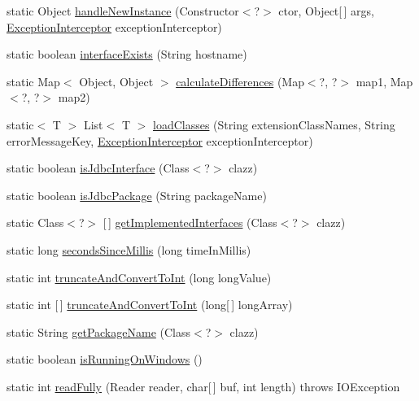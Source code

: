 \begin{DoxyCompactItemize}
\item 
static Object \mbox{\hyperlink{classcom_1_1mysql_1_1cj_1_1util_1_1_util_a6c3f08276e2a1f6721540f24e1996167}{handle\+New\+Instance}} (Constructor$<$?$>$ ctor, Object\mbox{[}$\,$\mbox{]} args, \mbox{\hyperlink{interfacecom_1_1mysql_1_1cj_1_1exceptions_1_1_exception_interceptor}{Exception\+Interceptor}} exception\+Interceptor)
\item 
static boolean \mbox{\hyperlink{classcom_1_1mysql_1_1cj_1_1util_1_1_util_a88747c641f2cab44ec8867dc38c3fa42}{interface\+Exists}} (String hostname)
\item 
static Map$<$ Object, Object $>$ \mbox{\hyperlink{classcom_1_1mysql_1_1cj_1_1util_1_1_util_a7ca2ca5ab2286628c8990a388ce6aa99}{calculate\+Differences}} (Map$<$?, ?$>$ map1, Map$<$?, ?$>$ map2)
\item 
static$<$ T $>$ List$<$ T $>$ \mbox{\hyperlink{classcom_1_1mysql_1_1cj_1_1util_1_1_util_a1934cc15d2aae4985ce372a84e920eb7}{load\+Classes}} (String extension\+Class\+Names, String error\+Message\+Key, \mbox{\hyperlink{interfacecom_1_1mysql_1_1cj_1_1exceptions_1_1_exception_interceptor}{Exception\+Interceptor}} exception\+Interceptor)
\item 
static boolean \mbox{\hyperlink{classcom_1_1mysql_1_1cj_1_1util_1_1_util_a6c781a9f788160ce358b6237b4a6b0da}{is\+Jdbc\+Interface}} (Class$<$?$>$ clazz)
\item 
static boolean \mbox{\hyperlink{classcom_1_1mysql_1_1cj_1_1util_1_1_util_a4ff66f7ccc05ec9631b13bb5e9e9fbbe}{is\+Jdbc\+Package}} (String package\+Name)
\item 
static Class$<$?$>$ \mbox{[}$\,$\mbox{]} \mbox{\hyperlink{classcom_1_1mysql_1_1cj_1_1util_1_1_util_acdf8981f8f07769f27e5f3b435fd538f}{get\+Implemented\+Interfaces}} (Class$<$?$>$ clazz)
\item 
static long \mbox{\hyperlink{classcom_1_1mysql_1_1cj_1_1util_1_1_util_a08372a744b3f8a35407af8dd8d0d44e4}{seconds\+Since\+Millis}} (long time\+In\+Millis)
\item 
static int \mbox{\hyperlink{classcom_1_1mysql_1_1cj_1_1util_1_1_util_a2f847b31da7b0217bf7c9dbbba3324db}{truncate\+And\+Convert\+To\+Int}} (long long\+Value)
\item 
static int \mbox{[}$\,$\mbox{]} \mbox{\hyperlink{classcom_1_1mysql_1_1cj_1_1util_1_1_util_a73b0a7029da0c63b85399eeee5d36527}{truncate\+And\+Convert\+To\+Int}} (long\mbox{[}$\,$\mbox{]} long\+Array)
\item 
static String \mbox{\hyperlink{classcom_1_1mysql_1_1cj_1_1util_1_1_util_a142027940787b4d09dc21ea4c5de617e}{get\+Package\+Name}} (Class$<$?$>$ clazz)
\item 
static boolean \mbox{\hyperlink{classcom_1_1mysql_1_1cj_1_1util_1_1_util_a4e59730a5516d2c70614031e108c51bb}{is\+Running\+On\+Windows}} ()
\item 
static int \mbox{\hyperlink{classcom_1_1mysql_1_1cj_1_1util_1_1_util_afdf93512d8a6651e10b26d2f6f5613b2}{read\+Fully}} (Reader reader, char\mbox{[}$\,$\mbox{]} buf, int length)  throws I\+O\+Exception 
\end{DoxyCompactItemize}


